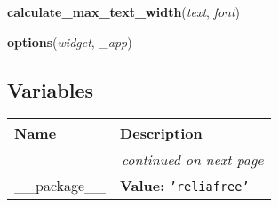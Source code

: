     \label{reliafree:utilities:calculate_max_text_width}

    \vspace{0.5ex}

\hspace{.8\funcindent}\begin{boxedminipage}{\funcwidth}

    \raggedright \textbf{calculate\_max\_text\_width}(\textit{text}, \textit{font})

\setlength{\parskip}{2ex}
\setlength{\parskip}{1ex}
    \end{boxedminipage}

    \label{reliafree:utilities:options}

    \vspace{0.5ex}

\hspace{.8\funcindent}\begin{boxedminipage}{\funcwidth}

    \raggedright \textbf{options}(\textit{widget}, \textit{\_app})

\setlength{\parskip}{2ex}
\setlength{\parskip}{1ex}
    \end{boxedminipage}



  \subsection{Variables}

    \vspace{-1cm}
\hspace{\varindent}\begin{longtable}{|p{\varnamewidth}|p{\vardescrwidth}|l}
\cline{1-2}
\cline{1-2} \centering \textbf{Name} & \centering \textbf{Description}& \\
\cline{1-2}
\endhead\cline{1-2}\multicolumn{3}{r}{\small\textit{continued on next page}}\\\endfoot\cline{1-2}
\endlastfoot\raggedright \_\-\_\-p\-a\-c\-k\-a\-g\-e\-\_\-\_\- & \raggedright \textbf{Value:} 
{\tt \texttt{'}\texttt{reliafree}\texttt{'}}&\\
\cline{1-2}
\end{longtable}

